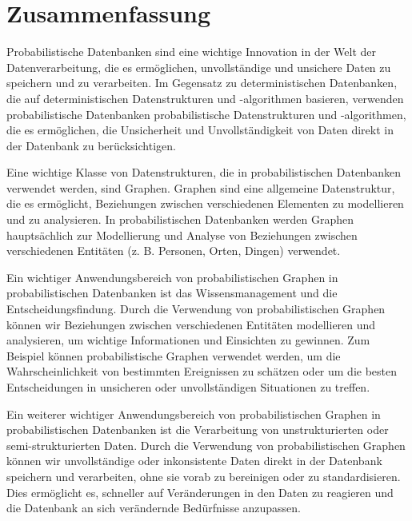 \chapter{Zusammenfassung}

Probabilistische Datenbanken sind eine wichtige Innovation in der Welt der Datenverarbeitung, die es ermöglichen, unvollständige und unsichere Daten zu speichern und zu verarbeiten. Im Gegensatz zu deterministischen Datenbanken, die auf deterministischen Datenstrukturen und -algorithmen basieren, verwenden probabilistische Datenbanken probabilistische Datenstrukturen und -algorithmen, die es ermöglichen, die Unsicherheit und Unvollständigkeit von Daten direkt in der Datenbank zu berücksichtigen.

Eine wichtige Klasse von Datenstrukturen, die in probabilistischen Datenbanken verwendet werden, sind Graphen. Graphen sind eine allgemeine Datenstruktur, die es ermöglicht, Beziehungen zwischen verschiedenen Elementen zu modellieren und zu analysieren. In probabilistischen Datenbanken werden Graphen hauptsächlich zur Modellierung und Analyse von Beziehungen zwischen verschiedenen Entitäten (z. B. Personen, Orten, Dingen) verwendet.

Ein wichtiger Anwendungsbereich von probabilistischen Graphen in probabilistischen Datenbanken ist das Wissensmanagement und die Entscheidungsfindung. Durch die Verwendung von probabilistischen Graphen können wir Beziehungen zwischen verschiedenen Entitäten modellieren und analysieren, um wichtige Informationen und Einsichten zu gewinnen. Zum Beispiel können probabilistische Graphen verwendet werden, um die Wahrscheinlichkeit von bestimmten Ereignissen zu schätzen oder um die besten Entscheidungen in unsicheren oder unvollständigen Situationen zu treffen.

Ein weiterer wichtiger Anwendungsbereich von probabilistischen Graphen in probabilistischen Datenbanken ist die Verarbeitung von unstrukturierten oder semi-strukturierten Daten. Durch die Verwendung von probabilistischen Graphen können wir unvollständige oder inkonsistente Daten direkt in der Datenbank speichern und verarbeiten, ohne sie vorab zu bereinigen oder zu standardisieren. Dies ermöglicht es, schneller auf Veränderungen in den Daten zu reagieren und die Datenbank an sich verändernde Bedürfnisse anzupassen.



